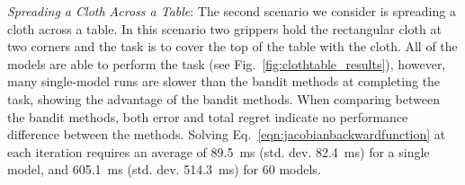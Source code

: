 \textit{Spreading a Cloth Across a Table}: The second scenario we consider is spreading a cloth across a table. In this scenario two grippers hold the rectangular cloth at two corners and the task is to cover the top of the table with the cloth. All of the models are able to perform the task (see Fig.~\ref{fig:clothtable_results}), however, many single-model runs are slower than the bandit methods at completing the task, showing the advantage of the bandit methods. When comparing between the bandit methods, both error and total regret indicate no performance difference between the methods. Solving Eq.~\eqref{eqn:jacobianbackwardfunction} at each iteration requires an average of 89.5~ms (std. dev. 82.4~ms) for a single model, and 605.1~ms (std. dev. 514.3~ms) for 60 models.


\begin{figure*}[t]
    \centering
    \vspace{-0.1in}
    \\
    \vspace{-0.15in}
    \vspace{-0.1in}
    \caption{Experimental results for the table coverage task. See Fig.~\ref{fig:ropecylinder_results} for description.}
    \label{fig:clothtable_results}
\end{figure*}




